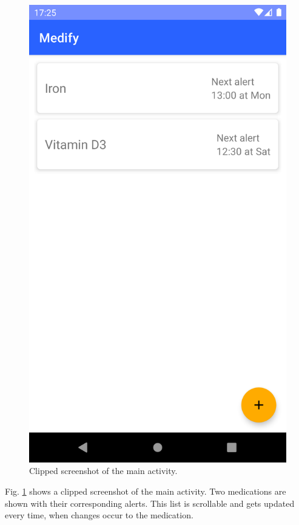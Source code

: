 \documentclass[conference]{IEEEtran}
\begin{document}
\begin{figure}[H]
	\centerline{\includegraphics[trim={0 1200px 0 0},clip,width=0.8\linewidth]{images/screenshots/main_activity.png}}
	\caption{Clipped screenshot of the main activity.}
	\label{fig:screenshot_main}
\end{figure}

Fig. \ref{fig:screenshot_main} shows a clipped screenshot of the main activity. Two medications are shown with 
their corresponding alerts. This list is scrollable and gets updated every time, when changes occur to the 
medication.
\end{document}
